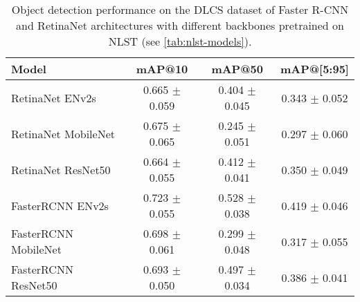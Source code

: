 \begin{table}[h]
    \centering
    \begin{tabular}{lccc}
        \hline
        \textbf{Model} & \textbf{mAP@10} & \textbf{mAP@50} & \textbf{mAP@[5:95]} \\
        \hline
        RetinaNet ENv2s      & 0.665 $\pm$ 0.059 & 0.404 $\pm$ 0.045 & 0.343 $\pm$ 0.052 \\
        RetinaNet MobileNet  & 0.675 $\pm$ 0.065 & 0.245 $\pm$ 0.051 & 0.297 $\pm$ 0.060 \\
        RetinaNet ResNet50   & 0.664 $\pm$ 0.055 & 0.412 $\pm$ 0.041 & 0.350 $\pm$ 0.049 \\
        \rowcolor{yellow!20}
        FasterRCNN ENv2s     & 0.723 $\pm$ 0.055 & 0.528 $\pm$ 0.038 & 0.419 $\pm$ 0.046 \\
        FasterRCNN MobileNet & 0.698 $\pm$ 0.061 & 0.299 $\pm$ 0.048 & 0.317 $\pm$ 0.055 \\
        FasterRCNN ResNet50  & 0.693 $\pm$ 0.050 & 0.497 $\pm$ 0.034 & 0.386 $\pm$ 0.041 \\
        \hline
    \end{tabular}
    \caption{Object detection performance on the DLCS dataset of Faster R-CNN and RetinaNet architectures with different backbones pretrained on NLST (see \ref{tab:nlst-models}).}
    \label{tab:dlcs-models-pretrained}
\end{table}